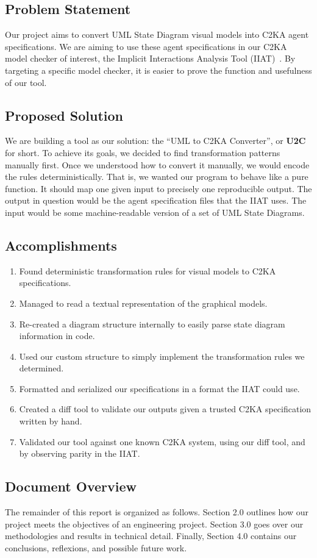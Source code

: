 \subsection{Problem Statement}\label{subsec:problem-statement}
Our project aims to convert UML State Diagram visual models into C2KA agent specifications.
We are aiming to use these agent specifications in our C2KA model checker of interest,
the Implicit Interactions Analysis Tool (IIAT)~\cite{repo_iiat}.
By targeting a specific model checker, it is easier to prove the function and usefulness of our tool.

\subsection{Proposed Solution}\label{subsec:proposed-solution}
We are building a tool as our solution: the ``UML to C2KA Converter'', or \textbf{U2C} for short.
To achieve its goals, we decided to find transformation patterns manually first.
Once we understood how to convert it manually, we would encode the rules deterministically.
That is, we wanted our program to behave like a pure function.
It should map one given input to precisely one reproducible output.
The output in question would be the agent specification files that the IIAT uses.
The input would be some machine-readable version of a set of UML State Diagrams.

\subsection{Accomplishments}\label{subsec:accomplishments}
\begin{enumerate}
    \item Found deterministic transformation rules for visual models
    to C2KA specifications.
    \item Managed to read a textual representation of the graphical models.
    \item Re-created a diagram structure internally to easily parse state diagram information in code.
    \item Used our custom structure to simply implement the transformation rules we determined.
    \item Formatted and serialized our specifications in a format the IIAT could use.
    \item Created a diff tool to validate our outputs given a trusted C2KA specification written by hand.
    \item Validated our tool against one known C2KA system,
    using our diff tool, and by observing parity in the IIAT\@.
\end{enumerate}

\subsection{Document Overview}\label{subsec:document-overview}
The remainder of this report is organized as follows.
Section 2.0 outlines how our project meets the objectives of an engineering project.
Section 3.0 goes over our methodologies and results in technical detail.
Finally, Section 4.0 contains our conclusions, reflexions, and possible future work.
